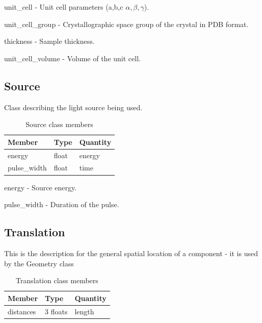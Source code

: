 \documentclass[usletter,11pt]{article}
\newcommand{\member}[2]
{ \noindent
{ \color{softBlue}  #1 - } #2
\vspace{0.2cm}
}
\begin{document}
\member{unit\_cell}{Unit cell parameters (a,b,c
  $\alpha,\beta,\gamma$).}

\member{unit\_cell\_group}{Crystallographic space group of the crystal
  in PDB format.}

\member{thickness}{Sample thickness.}

\member{unit\_cell\_volume}{Volume of the unit cell.}


\subsection{Source}
\label{table:source}

Class describing the light source being used.

\begin{table}[h!]\sffamily \footnotesize
\caption{Source class members}

\begin{tabular}{p{4.5cm} p{4.5cm}  p{2.5cm} }
\toprule
\bfseries Member     & \bfseries Type & \bfseries Quantity \\
\midrule
energy     & float & energy  \\
pulse\_width  & float & time  \\
\bottomrule
\end{tabular}
\end{table}

\member{energy}{Source energy.}

\member{pulse\_width}{Duration of the pulse.}

\subsection{Translation}
\label{table:translation}

This is the description for the general spatial location of a component - it is used by the Geometry class

\begin{table}[h!]\sffamily \footnotesize
\caption{Translation class members}

\begin{tabular}{p{4.5cm} p{4.5cm}  p{2.5cm} }
\toprule
\bfseries Member     & \bfseries Type & \bfseries Quantity \\
\midrule

distances & 3 floats & length \\
\bottomrule
\end{tabular}
\end{table}
\end{document}
